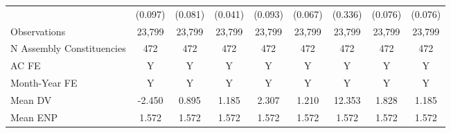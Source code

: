 {\begin{tabular}{l*{8}{c}}
            &     (0.097)         &     (0.081)         &     (0.041)         &     (0.093)         &     (0.067)         &     (0.336)         &     (0.076)         &     (0.076)         \\
Observations&      23,799         &      23,799         &      23,799         &      23,799         &      23,799         &      23,799         &      23,799         &      23,799         \\
N Assembly Constituencies&         472         &         472         &         472         &         472         &         472         &         472         &         472         &         472         \\
AC FE       &           Y         &           Y         &           Y         &           Y         &           Y         &           Y         &           Y         &           Y         \\
Month-Year FE&           Y         &           Y         &           Y         &           Y         &           Y         &           Y         &           Y         &           Y         \\
Mean DV     &      -2.450         &       0.895         &       1.185         &       2.307         &       1.210         &      12.353         &       1.828         &       1.185         \\
Mean ENP    &       1.572         &       1.572         &       1.572         &       1.572         &       1.572         &       1.572         &       1.572         &       1.572         \\
\bottomrule
\end{tabular}
}
